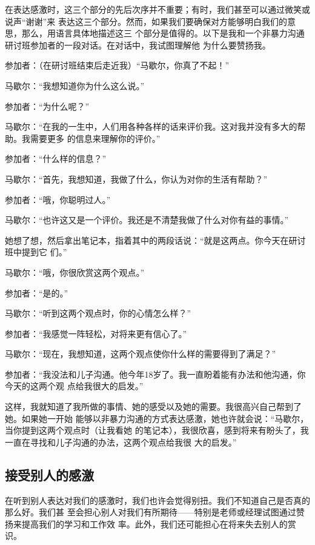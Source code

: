 \documentclass{ctexart}
\renewenvironment{quotation}{\setlength{\parskip}{0.5em}\setstretch{1.5}\kaishu\zihao{-5}\setlength{\parindent}{1em}}{\vspace{1em}}
\begin{document}
在表达感激时，这三个部分的先后次序并不重要；有时，我们甚至可以通过微笑或说声``谢谢''来
表达这三个部分。然而，如果我们要确保对方能够明白我们的意思，那么，用语言具体地描述这三
个部分是值得的。以下是我和一个非暴力沟通研讨班参加者的一段对话。在对话中，我试图理解他
为什么要赞扬我。


\begin{quotation}
	参加者：（在研讨班结束后走近我）``马歇尔，你真了不起！''

	马歇尔：``我想知道你为什么这么说。''

	参加者：``为什么呢？''

	马歇尔：``在我的一生中，人们用各种各样的话来评价我。这对我并没有多大的帮助。我需要更多
	的信息来理解你的评价。''

	参加者：``什么样的信息？''

	马歇尔：``首先，我想知道，我做了什么，你认为对你的生活有帮助？''

	参加者：``哦，你聪明过人。''

	马歇尔：``也许这又是一个评价。我还是不清楚我做了什么对你有益的事情。''

	她想了想，然后拿出笔记本，指着其中的两段话说：``就是这两点。你今天在研讨班中提到它
	们。''

	马歇尔：``哦，你很欣赏这两个观点。''

	参加者：``是的。''

	马歇尔：``听到这两个观点时，你的心情怎么样？''

	参加者：``我感觉一阵轻松，对将来更有信心了。''

	马歇尔：``现在，我想知道，这两个观点使你什么样的需要得到了满足？''

	参加者：``我没法和儿子沟通。他今年18岁了。我一直盼着能有办法和他沟通，你今天的这两个观
	点给我很大的启发。''
\end{quotation}

这样，我就知道了我所做的事情、她的感受以及她的需要。我很高兴自己帮到了她。如果她一开始
能够以非暴力沟通的方式表达感激，她也许就会说：``马歇尔，当你提到这两个观点时（让我看她
的笔记本），我很欣喜，感到将来有盼头了，我一直在寻找和儿子沟通的办法，这两个观点给我很
大的启发。''


\subsection{接受别人的感激}

在听到别人表达对我们的感激时，我们也许会觉得别扭。我们不知道自己是否真的那么好。我们甚
至会担心别人对我们有所期待------特别是老师或经理试图通过赞扬来提高我们的学习和工作效
率。此外，我们还可能担心在将来失去别人的赏识。
\end{document}
